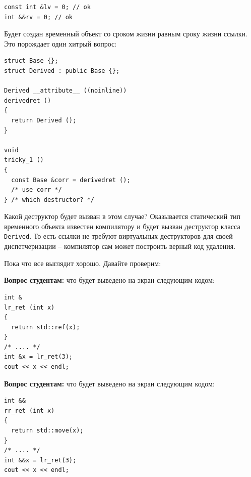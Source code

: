 \documentclass[a4paper,12pt,oneside]{article}
\newif\ifanswers
\begin{document}
\begin{lstlisting}
const int &lv = 0; // ok
int &&rv = 0; // ok
\end{lstlisting}

Будет создан временный объект со сроком жизни равным сроку жизни ссылки. Это порождает один хитрый вопрос:

\begin{lstlisting}
struct Base {};
struct Derived : public Base {};

Derived __attribute__ ((noinline))
derivedret ()
{
  return Derived ();
}

void
tricky_1 ()
{
  const Base &corr = derivedret ();
  /* use corr */
} /* which destructor? */
\end{lstlisting}

Какой деструктор будет вызван в этом случае? Оказывается статический тип временного объекта известен компилятору и будет вызван деструктор класса \lstinline!Derived!. То есть ссылки не требуют виртуальных деструкторов для своей диспетчеризации -- компилятор сам может построить верный код удаления.

Пока что все выглядит хорошо. Давайте проверим:

\textbf{Вопрос студентам:} что будет выведено на экран следующим кодом:

\begin{lstlisting}
int &
lr_ret (int x)
{
  return std::ref(x);
}
/* .... */
int &x = lr_ret(3);
cout << x << endl;
\end{lstlisting}

\ifanswers
Правильный ответ: что угодно, это dangling reference.
\fi

\textbf{Вопрос студентам:} что будет выведено на экран следующим кодом:

\begin{lstlisting}
int &&
rr_ret (int x)
{
  return std::move(x);
}
/* .... */
int &&x = lr_ret(3);
cout << x << endl;
\end{lstlisting}

\ifanswers
Правильный ответ: и снова что угодно. Получилась удивительную вещь: \textbf{dangling rvalue reference}. Так же как висячих левых, надо опасаться висячих правых ссылок. Опять-таки есть способы их получить:

\begin{lstlisting}
extern int xret (int x);
int &&p = xret (3); /* ok */
int &&p = std::move (xret (3)); /* dangling rvalue reference */
\end{lstlisting}
\fi
\end{document}
